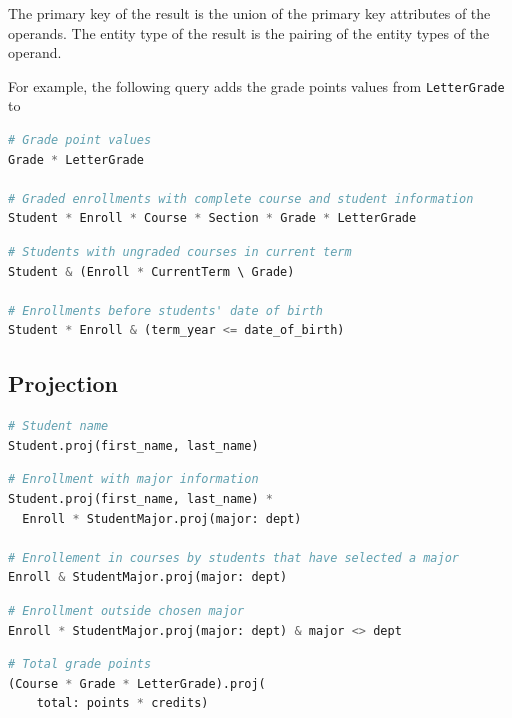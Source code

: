 \documentclass[letter,10pt]{article}
\begin{document}
The primary key of the result is the union of the primary key attributes of the operands. 
The entity type of the result is the pairing of the entity types of the operand.  

For example, the following query adds the grade points values from \lstinline$LetterGrade$ to 
\begin{lstlisting}[language=Python, caption={Combining entities.}, label={lst:join1}]
# Grade point values
Grade * LetterGrade

# Graded enrollments with complete course and student information
Student * Enroll * Course * Section * Grade * LetterGrade
\end{lstlisting}

\begin{lstlisting}[language=Python, caption={Join in expressions.}, label={lst:join2}]
# Students with ungraded courses in current term
Student & (Enroll * CurrentTerm \ Grade)

# Enrollments before students' date of birth
Student * Enroll & (term_year <= date_of_birth)
\end{lstlisting}

\subsection{Projection}\label{sec:proj}
\begin{lstlisting}[language=Python, caption={Selecting  attributes.}, label={lst:select}]
# Student name
Student.proj(first_name, last_name)
\end{lstlisting}

\begin{lstlisting}[language=Python, caption={Renaming attributes.}, label={lst:rename}]
# Enrollment with major information
Student.proj(first_name, last_name) * 
  Enroll * StudentMajor.proj(major: dept)

# Enrollement in courses by students that have selected a major
Enroll & StudentMajor.proj(major: dept)
\end{lstlisting}

\begin{lstlisting}[language=Python, caption={Projection in composite expressions.}, label={lst:proj}]
# Enrollment outside chosen major
Enroll * StudentMajor.proj(major: dept) & major <> dept
\end{lstlisting}

\begin{lstlisting}[language=Python, caption={Extension: calculated attributes.}, label={lst:extend}]
# Total grade points
(Course * Grade * LetterGrade).proj(
    total: points * credits)
\end{lstlisting}
\end{document}
